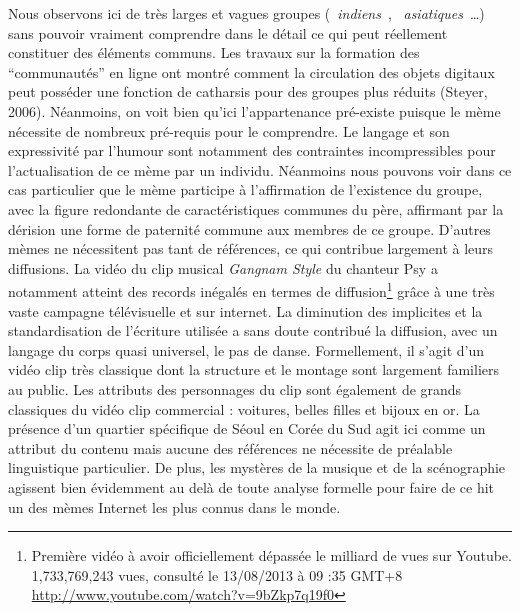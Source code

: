 Nous observons ici de tr\`es larges et vagues groupes
({\guillemotleft}~\textit{indiens}~{\guillemotright},
{\guillemotleft}~\textit{asiatiques}~{\guillemotright}{\dots}) sans
pouvoir vraiment comprendre dans le d\'etail ce qui peut r\'eellement
constituer des \'el\'ements communs. Les travaux sur la formation des
{\textquotedblleft}communaut\'es{\textquotedblright} en ligne ont
montr\'e comment la circulation des objets digitaux peut poss\'eder une
fonction de catharsis pour des groupes plus r\'eduits (Steyer, 2006).
N\'eanmoins, on voit bien qu{\textquoteright}ici
l{\textquoteright}appartenance pr\'e-existe puisque le m\`eme
n\'ecessite de nombreux pr\'e-requis pour le comprendre. Le langage et
son expressivit\'e par l{\textquoteright}humour sont notamment des
contraintes incompressibles pour l{\textquoteright}actualisation de ce
m\`eme par un individu. N\'eanmoins nous pouvons voir dans ce cas
particulier que le m\`eme participe \`a l{\textquoteright}affirmation
de l{\textquoteright}existence du groupe, avec la figure redondante de
caract\'eristiques communes du p\`ere, affirmant par la d\'erision une
forme de paternit\'e commune aux membres de ce groupe.
D{\textquoteright}autres m\`emes ne n\'ecessitent pas tant de
r\'ef\'erences, ce qui contribue largement \`a leurs diffusions. La
vid\'eo du clip musical \textit{Gangnam Style} du chanteur Psy a
notamment atteint des records in\'egal\'es en termes de
diffusion\footnote{ Premi\`ere vid\'eo \`a avoir officiellement
d\'epass\'ee le milliard de vues sur Youtube. 1,733,769,243 vues,
consult\'e le 13/08/2013 \`a 09 :35 GMT+8
\url{http://www.youtube.com/watch?v=9bZkp7q19f0}} gr\^ace \`a une
tr\`es vaste campagne t\'el\'evisuelle et sur internet. La diminution
des implicites et la standardisation de l{\textquoteright}\'ecriture
utilis\'ee a sans doute contribu\'e la diffusion, avec un langage du
corps quasi universel, le pas de danse. Formellement, il
s{\textquoteright}agit d{\textquoteright}un vid\'eo clip tr\`es
classique dont la structure et le montage sont largement familiers au
public. Les attributs des personnages du clip sont \'egalement de
grands classiques du vid\'eo clip commercial : voitures, belles filles
et bijoux en or. La pr\'esence d{\textquoteright}un quartier
sp\'ecifique de S\'eoul en Cor\'ee du Sud agit ici comme un attribut du
contenu mais aucune des r\'ef\'erences ne n\'ecessite de pr\'ealable
linguistique particulier. De plus, les myst\`eres de la musique et de
la sc\'enographie agissent bien \'evidemment au del\`a de toute analyse
formelle pour faire de ce hit un des m\`emes Internet les plus connus
dans le monde.

